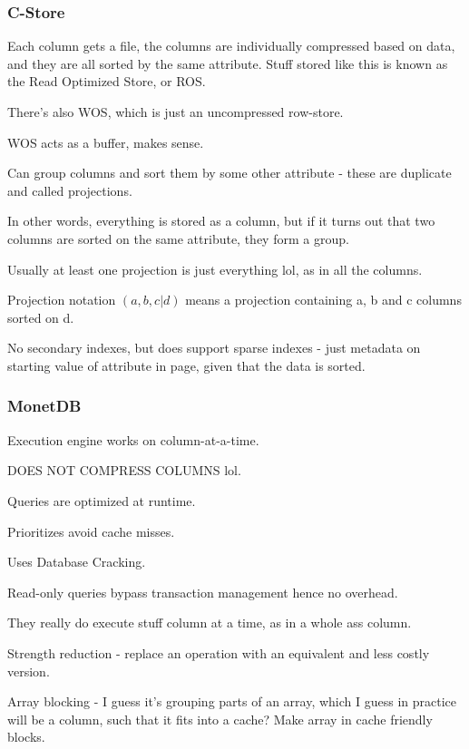 \documentclass{article}
\begin{document}
		\subsubsection{C-Store}
		
			Each column gets a file, the columns are individually compressed based on data, and they are all sorted by the same attribute. Stuff stored like this is known as the Read Optimized Store, or ROS.
			
			There's also WOS, which is just an uncompressed row-store.
			
			WOS acts as a buffer, makes sense.
			
			Can group columns and sort them by some other attribute - these are duplicate and called projections.
			
			In other words, everything is stored as a column, but if it turns out that two columns are sorted on the same attribute, they form a group.
			
			Usually at least one projection is just everything lol, as in all the columns.
			
			Projection notation $(a, b, c|d)$ means a projection containing a, b and c columns sorted on d.
			
			No secondary indexes, but does support sparse indexes - just metadata on starting value of attribute in page, given that the data is sorted.
			
		\subsubsection{MonetDB}
		
			Execution engine works on column-at-a-time.
			
			DOES NOT COMPRESS COLUMNS lol.
			
			Queries are optimized at runtime.
			
			Prioritizes avoid cache misses.
			
			Uses Database Cracking.
			
			Read-only queries bypass transaction management hence no overhead. 			
			
			They really do execute stuff column at a time, as in a whole ass column.
			
			Strength reduction - replace an operation with an equivalent and less costly version.
			
			Array blocking - I guess it's grouping parts of an array, which I guess in practice will be a column, such that it fits into a cache? Make array in cache friendly blocks.
			
\end{document}
